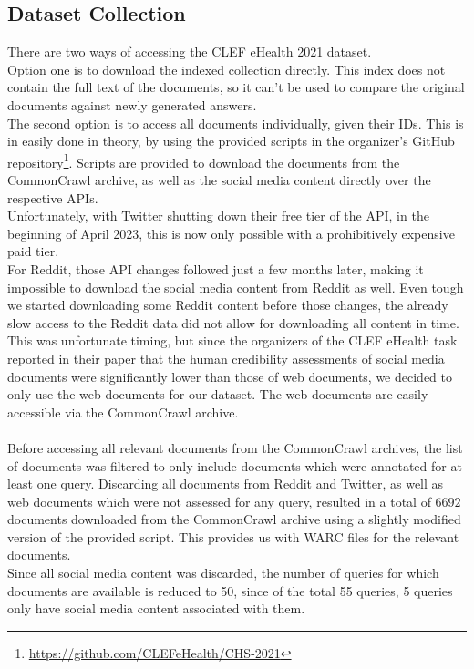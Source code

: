 \subsection{Dataset Collection}
There are two ways of accessing the CLEF eHealth 2021 dataset.
\\
Option one is to download the indexed collection directly.
This index does not contain the full text of the documents, so it can't be used to compare the original documents against newly generated answers.
\\
The second option is to access all documents individually, given their IDs.
This is in easily done in theory, by using the provided scripts in the organizer's GitHub repository\footnote{\url{https://github.com/CLEFeHealth/CHS-2021}}.
Scripts are provided to download the documents from the CommonCrawl archive, as well as the social media content directly over the respective APIs.
\\
Unfortunately, with Twitter shutting down their free tier of the API, in the beginning of April 2023, this is now only possible with a prohibitively expensive paid tier.
\\
For Reddit, those API changes followed just a few months later, making it impossible to download the social media content from Reddit as well.
Even tough we started downloading some Reddit content before those changes, the already slow access to the Reddit data did not allow for downloading all content in time.
\\
This was unfortunate timing, but since the organizers of the CLEF eHealth task reported in their paper that the human credibility assessments of social media documents were significantly lower than those of web documents, we decided to only use the web documents for our dataset.
The web documents are easily accessible via the CommonCrawl archive.
\\
\\
Before accessing all relevant documents from the CommonCrawl archives, the list of documents was filtered to only include documents which were annotated for at least one query.
Discarding all documents from Reddit and Twitter, as well as web documents which were not assessed for any query, resulted in a total of $6692$ documents downloaded from the CommonCrawl archive using a slightly modified version of the provided script.
This provides us with WARC files for the relevant documents.
\\
Since all social media content was discarded, the number of queries for which documents are available is reduced to 50, since of the total 55 queries, 5 queries only have social media content associated with them.

